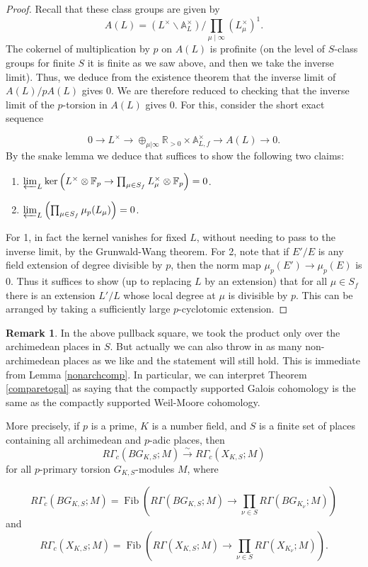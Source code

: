 \documentclass[12pt]{article}
\theoremstyle{definition}
\newtheorem{remark}[theorem]{Remark}
\newcommand{\on}{\operatorname}
\newcommand{\mbb}{\mathbb}
\begin{document}
\begin{proof}
Recall that these class groups are given by
$$A(L) = (L^\times\backslash\mathbb{A}_L^\times)/\prod_{\mu\mid\infty}(L_\mu^\times)^1.$$
The cokernel of multiplication by $p$ on $A(L)$ is profinite (on the level of $S$-class groups for finite $S$ it is finite as we saw above, and then we take the inverse limit).  Thus, we deduce from the existence theorem that the inverse limit of $A(L)/pA(L)$ gives $0$.  We are therefore reduced to checking that the inverse limit of the $p$-torsion in $A(L)$ gives $0$.  For this, consider the short exact sequence

$$0 \to L^\times \to \oplus_{\mu | \infty} \mbb{R}_{>0} \times \mbb{A}_{L,f}^\times \to A(L) \to 0.$$
By the snake lemma we deduce that suffices to show the following two claims:
\begin{enumerate}
\item $\varprojlim_L\on{ker}\left(L^\times\otimes \mbb{F}_p \to \prod_{\mu\in S_f}L_\mu^\times\otimes\mbb{F}_p\right)=0$.
\item $\varprojlim_L \left(\prod_{\mu\in S_f}\mu_p(L_\mu)\right)=0$.

\end{enumerate}

For 1, in fact the kernel vanishes for fixed $L$, without needing to pass to the inverse limit, by the Grunwald-Wang theorem.  For 2, note that if $E'/E$ is any field extension of degree divisible by $p$, then the norm map $\mu_p(E')\to\mu_p(E)$ is $0$.  Thus it suffices to show (up to replacing $L$ by an extension) that for all $\mu\in S_f$ there is an extension $L'/L$ whose local degree at $\mu$ is divisible by $p$.  This can be arranged by taking a sufficiently large $p$-cyclotomic extension.
\end{proof}


\begin{remark}
In the above pullback square, we took the product only over the archimedean places in $S$.  But actually we can also throw in as many non-archimedean places as we like  and the statement will still hold.  This is immediate from Lemma \ref{nonarchcomp}.  In particular, we can interpret Theorem \ref{comparetogal} as saying that the compactly supported Galois cohomology is the same as the compactly supported Weil-Moore cohomology.

More precisely, if $p$ is a prime, $K$ is a number field, and $S$ is a finite set of places containing all archimedean and $p$-adic places, then
$$R\Gamma_c(BG_{K,S};M)\overset{\sim}{\rightarrow} R\Gamma_c(X_{K,S};M)$$
for all $p$-primary torsion $G_{K,S}$-modules $M$, where

$$R\Gamma_c(BG_{K,S};M) = \on{Fib}\left(R\Gamma(BG_{K,S};M)\to\prod_{\nu\in S}R\Gamma(BG_{K_\nu};M)\right)$$
and
$$R\Gamma_c(X_{K,S};M) = \on{Fib}\left(R\Gamma(X_{K,S};M)\to\prod_{\nu\in S}R\Gamma(X_{K_\nu};M)\right).$$
\end{remark}
\end{document}
